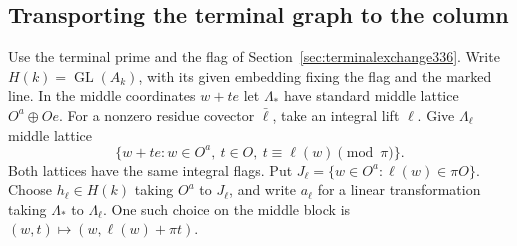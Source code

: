 \documentclass[a4paper,11pt]{article}
\theoremstyle{definition}
\theoremstyle{remark}
\numberwithin{equation}{section}
\newcommand{\GL}{\operatorname{GL}}
\begin{document}
\subsection{Transporting the terminal graph to the column}\label{sec:graphtransport337}
Use the terminal prime and the flag of Section~\ref{sec:terminalexchange336}.
Write \(H(k)=\GL(A_k)\), with its given embedding fixing the flag
and the marked line. In the middle coordinates \(w+t e\) let
\(\Lambda_*\) have standard middle lattice \(O^a\oplus Oe\).
For a nonzero residue covector \(\bar\ell\), take an integral lift
\(\ell\). Give \(\Lambda_\ell\) middle lattice
\[
 \{w+t e:w\in O^a,\ t\in O,\ t\equiv\ell(w)\pmod\pi\}.
\]
Both lattices have the same integral flags. Put \(J_\ell=\{w\in
O^a:\ell(w)\in\pi O\}\). Choose \(h_\ell\in H(k)\) taking \(O^a\)
to \(J_\ell\), and write \(a_\ell\) for a linear transformation
taking \(\Lambda_*\) to \(\Lambda_\ell\). One such choice on the
middle block is \((w,t)\mapsto(w,\ell(w)+\pi t)\).
\end{document}
